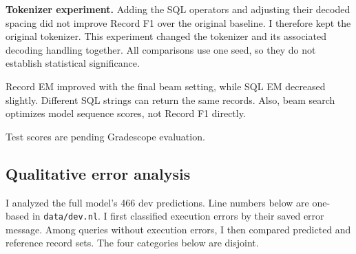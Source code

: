 \documentclass[11pt]{article}
\begin{document}
\textbf{Tokenizer experiment.} Adding the SQL operators and adjusting their decoded spacing did not improve Record F1 over the original baseline. I therefore kept the original tokenizer. This experiment changed the tokenizer and its associated decoding handling together. All comparisons use one seed, so they do not establish statistical significance.

Record EM improved with the final beam setting, while SQL EM decreased slightly. Different SQL strings can return the same records. Also, beam search optimizes model sequence scores, not Record F1 directly.

Test scores are pending Gradescope evaluation.

\newpage
\subsection{Qualitative error analysis}
I analyzed the full model's 466 dev predictions. Line numbers below are one-based in \texttt{data/dev.nl}. I first classified execution errors by their saved error message. Among queries without execution errors, I then compared predicted and reference record sets. The four categories below are disjoint.
\end{document}
